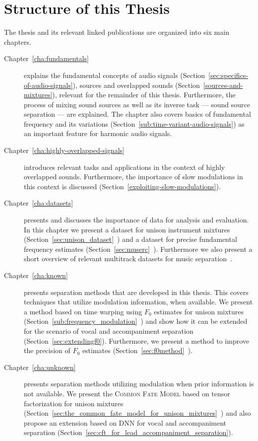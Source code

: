 \clearpage

\section{Structure of this Thesis}

The thesis and its relevant linked publications are organized into six main chapters.
\begin{description}
  \item[Chapter~\ref{cha:fundamentals}] explains the fundamental concepts of audio signals (Section~\ref{sec:specifics-of-audio-signals}), sources and overlapped sounds (Section~\ref{sources-and-mixtures}), relevant for the remainder of this thesis.
  Furthermore, the process of mixing sound sources as well as its inverse task --- sound source separation --- are explained.
  The chapter also covers basics of fundamental frequency and its variations (Section~\ref{sub:time-variant-audio-signals}) as an important feature for harmonic audio signals.
  \item[Chapter~\ref{cha:highly-overlapped-signals}] introduces relevant tasks and applications in the context of highly overlapped sounds.
  Furthermore, the importance of slow modulations in this context is discussed (Section~\ref{exploiting-slow-modulations}).
  \item[Chapter~\ref{cha:datasets}] presents and discusses the importance of data for analysis and evaluation.
  In this chapter we present a dataset for unison instrument mixtures (Section~\ref{sec:unison_dataset}~\cite{oss_unison, stoeter14}) and a dataset for precise fundamental frequency estimates (Section~\ref{sec:muserc}~\cite{oss_muserc, stoeter15acm}). Furthermore we also present a short overview of relevant multitrack datasets for music separation~\cite{liutkus17, stoeter18sisec}.
  \item[Chapter~\ref{cha:known}] presents separation methods that are developed in this thesis. This covers techniques that utilize modulation information, when available. We present a method based on time warping using $F_0$ estimates for unison mixtures (Section~\ref{sub:frequency_modulation}~\cite{stoeter14}) and show how it can be extended for the scenario of vocal and accompaniment separation (Section~\ref{sec:extendingf0}). Furthermore, we present a method to improve the precision of $F_0$ estimates (Section~\ref{sec:f0method}~\cite{stoeter15icassp}).
  \item[Chapter~\ref{cha:unknown}] presents separation methods utilizing modulation when prior information is not available. We present the \textsc{Common Fate Model} based on tensor factorization for unison mixtures (Section~\ref{sec:the_common_fate_model_for_unison_mixtures}~\cite{stoeter16}) and also propose an extension based on \acs{DNN} for vocal and accompaniment separation (Section~\ref{sec:cft_for_lead_accompaniment_separation}).

\end{description}

